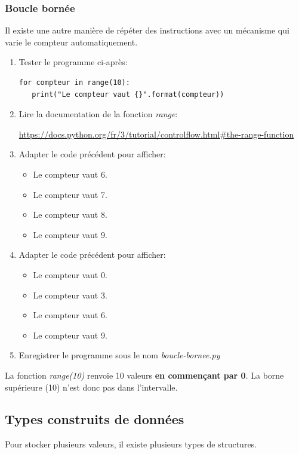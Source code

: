 \documentclass[a4paper,11pt]{article}
\begin{document}
\begin{Form}
\subsubsection{Boucle bornée}
Il existe une autre manière de répéter des instructions avec un mécanisme qui varie le compteur automatiquement.
\begin{activite}
\begin{enumerate}
\item Tester le programme ci-après:
\begin{lstlisting}
for compteur in range(10):
   print("Le compteur vaut {}".format(compteur))
\end{lstlisting}
\item Lire la documentation de la fonction \emph{range}:
\begin{center}
\url{https://docs.python.org/fr/3/tutorial/controlflow.html#the-range-function}
\end{center}
\item Adapter le code précédent pour afficher:
\begin{itemize}
\item Le compteur vaut 6.
\item Le compteur vaut 7.
\item Le compteur vaut 8.
\item Le compteur vaut 9.
\end{itemize}
\item Adapter le code précédent pour afficher:
\begin{itemize}
\item Le compteur vaut 0.
\item Le compteur vaut 3.
\item Le compteur vaut 6.
\item Le compteur vaut 9.
\end{itemize}
\item Enregistrer le programme sous le nom \emph{boucle-bornee.py}
\end{enumerate}
\end{activite}
\begin{aretenir}
La fonction \emph{range(10)} renvoie 10 valeurs \textbf{en commençant par 0}. La borne supérieure (10) n'est donc pas dans l'intervalle.
\end{aretenir}
\subsection{Types construits de données}
Pour stocker plusieurs valeurs, il existe plusieurs types de structures.

\end{Form}
\end{document}
